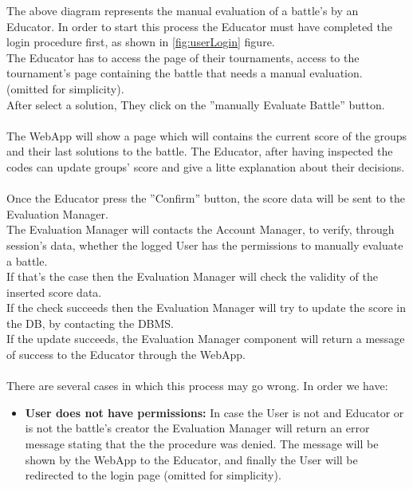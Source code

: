 \documentclass{article}
\begin{document}
{        \newpage
        The above diagram represents the manual evaluation of a battle’s by an Educator.
        In order to start this process the Educator must have completed the login procedure first, as shown in \ref{fig:userLogin}
        figure.\\ 
        The Educator has to access the page of their tournaments, access to the tournament's page containing the 
        battle that needs a manual evaluation. (omitted for simplicity).\\
        After select a solution, They click on the ”manually Evaluate Battle” button.\\
        \\
        The WebApp will show a page which will contains the current score of the groups and their last solutions to the battle.
        The Educator, after having inspected the codes can update groups' score and give a litte explanation
        about their decisions.
        \\ \\
        Once the Educator press the ”Confirm” button, the score data will be sent to the Evaluation Manager.\\
        The Evaluation Manager will contacts the Account Manager, to verify, through
        session’s data, whether the logged User has the permissions to manually
        evaluate a battle.\\ If that’s the case then the Evaluation Manager will
        check the validity of the inserted score data.
        \\
        If the check succeeds then the Evaluation Manager will try to update the score
        in the DB, by contacting the DBMS.\\
        If the update succeeds, the Evaluation Manager component will return a message
        of success to the Educator through the WebApp.
        \\ \\
        There are several cases in which this process may go wrong. In order we have:
        \begin{itemize}
            \item \textbf{User does not have permissions:} In case the User is not and Educator
            or is not the battle’s creator the Evaluation Manager will return an error message 
            stating that the the procedure was denied. The message will be shown 
            by the WebApp to the Educator, and finally the User will be
            redirected to the login page (omitted for simplicity).

\end{itemize}}
\end{document}
